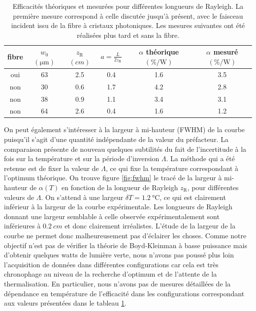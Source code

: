 \documentclass[11pt,a4paper]{article}
\newcommand{\ra}[1]{\renewcommand{\arraystretch}{#1}}
\newcommand{\zr}{z_\mathsc{R}}
\newcommand{\mathsc}[1]{\mathrm{\scriptscriptstyle {#1}}}
\begin{document}
\begin{table}[h]\centering
\ra{1.3}
\begin{tabular}{@{}cccccc@{}}\toprule
	fibre & $w_0$ $(\unit{\micro\meter})$ & $\zr$ $(\unit{cm})$ & $a=\frac L {2\zr}$ & $\alpha$ théorique $(\unit{\percent\per\watt})$ & $\alpha$ mesuré $(\unit{\percent\per\watt})$ \\ \midrule
	oui & 63     & 2.5 & 0.4 & 1.6 & 3.5 \\ \midrule  
	non & 30    & 0.6 & 1.7 & 4.2                & 2.8             \\
	non & 38    & 0.9 & 1.1 & 3.4                & 3.1             \\
	non & 64    & 2.6 & 0.4 & 1.6                & 1.2             \\ \bottomrule
\end{tabular}
\caption{Efficacités théoriques et mesurées pour différentes longueurs de Rayleigh. \small La première mesure correspond à celle discutée jusqu'à présent, avec le faisceau incident issu de la fibre à cristaux photoniques. Les mesures suivantes ont été réalisées plus tard et sans la fibre.}
\label{table:bp}
\end{table}

On peut également s'intéresser à la largeur à mi-hauteur (FWHM) de la courbe puisqu'il s'agit d'une quantité indépendante de la valeur du préfacteur.
La comparaison présente de nouveau quelques subtilités du fait de l'incertitude à la fois sur la température et sur la période d'inversion $\Lambda$. La méthode qui a été retenue est de fixer la valeur de $\Lambda$, ce qui fixe la température correspondant à l'optimum théorique.
On trouve figure \ref{fig:fwhm} le tracé de la largeur à mi-hauteur de $\alpha(T)$ en fonction de la longueur de Rayleigh $\zr$, pour différentes valeurs de $\Lambda$. On s'attend à une largeur $\delta T = \SI{1.2}{\celsius}$, ce qui est clairement inférieur à la largeur de la courbe expérimentale. Les longueurs de Rayleigh donnant une largeur semblable à celle observée expérimentalement sont inférieures à $\SI{0.2}{cm}$ et donc clairement irréalistes. L'étude de la largeur de la courbe ne permet donc malheureusement pas d'éclairer les choses. Comme notre objectif n'est pas de vérifier la théorie de Boyd-Kleinman à basse puissance mais d'obtenir quelques watts de lumière verte, nous n'avons pas poussé plus loin l'acquisition de données dans différentes configurations car cela est très chronophage au niveau de la recherche d'optimum et de l'attente de la thermalisation. En particulier, nous n'avons pas de mesures détaillées de la dépendance en température de l'efficacité dans les configurations correspondant aux valeurs présentées dans le tableau \ref{table:bp}.
\end{document}

